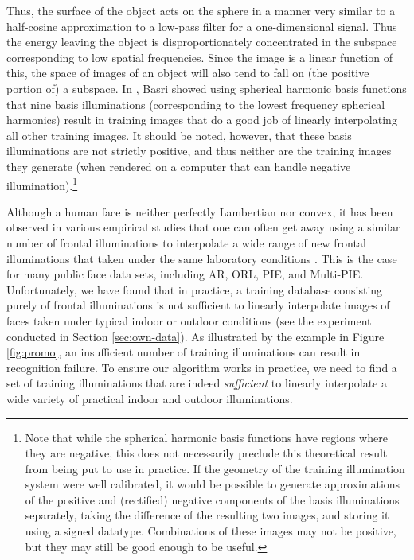 Thus, the surface of the object acts on the sphere in a manner very similar to
a half-cosine approximation to a low-pass filter for a one-dimensional signal.
Thus the energy leaving the object is disproportionately concentrated in the
subspace corresponding to low spatial frequencies.  Since the image is a linear
function of this, the space of images of an object will also tend to fall on
(the positive portion of) a subspace.   In \cite{Basri2003-PAMI}, Basri showed
using spherical harmonic basis functions that nine basis illuminations
(corresponding to the lowest frequency spherical harmonics) result in training
images that do a good job of linearly interpolating all other training images.
It should be noted, however, that these basis illuminations are not strictly
positive, and thus neither are the training images they generate (when rendered
on a computer that can handle negative illumination).\footnote{Note that
while the spherical harmonic basis functions have regions where they are
negative, this does not necessarily preclude this theoretical result from being
put to use in practice.  If the geometry of the training illumination system
were well calibrated, it would be possible to generate approximations of the
positive and (rectified) negative components of the basis illuminations
separately, taking the difference of the resulting two images, and storing it
using a signed datatype.  Combinations of these images may not be positive, but
they may still be good enough to be useful.}

Although a human face is neither perfectly Lambertian nor convex, it has been
observed in various empirical studies that one can often get away using a
similar number of frontal illuminations to interpolate a wide range of new
frontal illuminations that taken under the same laboratory conditions
\cite{Georghiades2001-PAMI}. This is the case for many public face data sets,
including AR, ORL, PIE, and Multi-PIE.  Unfortunately, we have found that in
practice, a training database consisting purely of frontal illuminations is not
sufficient to linearly interpolate images of faces taken under typical indoor
or outdoor conditions (see the experiment conducted in Section
\ref{sec:own-data}). As illustrated by the example in Figure \ref{fig:promo},
an insufficient number of training illuminations can result in recognition
failure.  To ensure our algorithm works in practice, we need to find a set of
training illuminations that are indeed {\em sufficient} to linearly interpolate
a wide variety of practical indoor and outdoor illuminations.

